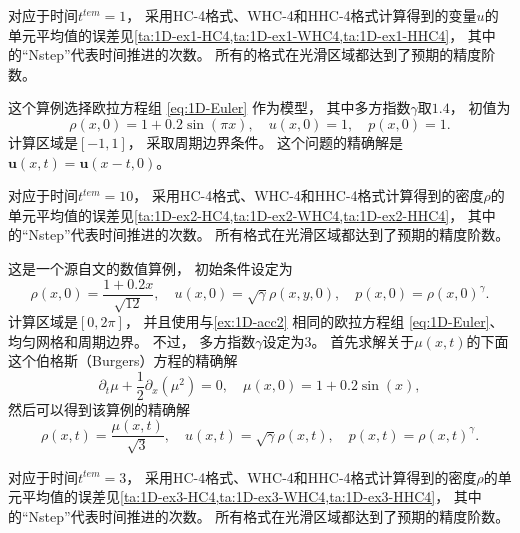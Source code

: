 对应于时间$t^{tem}=1$，
采用HC-4格式、WHC-4和HHC-4格式计算得到的变量$u$的单元平均值的误差见\cref{ta:1D-ex1-HC4,ta:1D-ex1-WHC4,ta:1D-ex1-HHC4}，
其中的“Nstep”代表时间推进的次数。
所有的格式在光滑区域都达到了预期的精度阶数。



\begin{example}[一维欧拉方程组的线性退化的精度测试]
  \label{ex:1D-acc2}
  这个算例选择欧拉方程组 \cref{eq:1D-Euler} 作为模型，
  其中多方指数$\gamma$取$1.4$，
  初值为
  \begin{equation}
    \rho(x, 0) = 1 + 0.2\sin(\pi x), \quad u(x,0)=1, \quad p(x,0)=1.
  \end{equation}
  计算区域是$[-1,1]$，
  采取周期边界条件。
  这个问题的精确解是${\bm{u}}(x,t) = {\bm{u}}(x-t,0)$。
\end{example}

对应于时间$t^{tem}=10$，
采用HC-4格式、WHC-4和HHC-4格式计算得到的密度$\rho$的单元平均值的误差见\cref{ta:1D-ex2-HC4,ta:1D-ex2-WHC4,ta:1D-ex2-HHC4}，
其中的“Nstep”代表时间推进的次数。
所有格式在光滑区域都达到了预期的精度阶数。



\begin{example}[一维欧拉方程组的非线性的精度测试]
  \label{ex:1D-acc3}
  这是一个源自文\cite{Gamma3-HWENO}的数值算例，
  初始条件设定为
  \begin{equation}
    \rho(x, 0)=\frac{1+0.2x}{\sqrt{12}}, \quad
    u(x, 0)=\sqrt{\gamma}\rho(x, y, 0), \quad
    p(x, 0)=\rho(x, 0)^\gamma.
  \end{equation}
  计算区域是$[0, 2\pi]$，
  并且使用与\cref{ex:1D-acc2} 相同的欧拉方程组 \cref{eq:1D-Euler}、均匀网格和周期边界。
  不过，
  多方指数$\gamma$设定为3。
  首先求解关于$\mu(x, t)$的下面这个伯格斯（Burgers）方程的精确解
  \begin{equation}
    {\partial_{t}}\mu+\frac12{\partial_{x}}\left(\mu^2\right)=0, \quad
    \mu(x, 0)=1+0.2\sin(x),
  \end{equation}
  然后可以得到该算例的精确解
  \begin{equation}
    \rho (x, t)=\frac{\mu(x, t)}{\sqrt{3}}, \quad
    u (x, t)=\sqrt{\gamma} \rho (x, t), \quad
    p (x, t)=\rho (x, t)^\gamma.
  \end{equation}
\end{example}

对应于时间$t^{tem}=3$，
采用HC-4格式、WHC-4和HHC-4格式计算得到的密度$\rho$的单元平均值的误差见\cref{ta:1D-ex3-HC4,ta:1D-ex3-WHC4,ta:1D-ex3-HHC4}，
其中的“Nstep”代表时间推进的次数。
所有格式在光滑区域都达到了预期的精度阶数。

